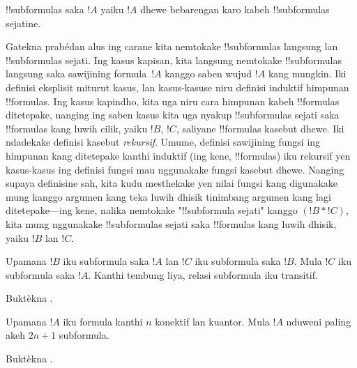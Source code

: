 \documentclass[../../../include/open-logic-section]{subfiles}
\begin{document}
\begin{defn}[!!^{subformula}]
!!{subformula}s saka $!A$ yaiku $!A$ dhewe bebarengan karo kabeh
!!{subformula}s sejatine.
\end{defn}

\begin{explain}
Gatekna prabédan alus ing carane kita nemtokake !!{subformula}s
langsung lan !!{subformula}s sejati. Ing kasus kapisan, kita
langsung nemtokake !!{subformula}s langsung saka sawijining
formula~$!A$ kanggo saben wujud $!A$ kang mungkin. Iki definisi
eksplisit miturut kasus, lan kasus-kasuse niru definisi induktif
himpunan !!{formula}s. Ing kasus kapindho, kita uga niru cara
himpunan kabeh !!{formula}s ditetepake, nanging ing saben kasus kita
uga nyakup !!{subformula}s sejati saka !!{formula}s kang luwih cilik,
yaiku $!B$, $!C$, saliyane !!{formula}s kasebut dhewe. Iki ndadekake
definisi kasebut \emph{rekursif}. Umume, definisi sawijining fungsi
ing himpunan kang ditetepake kanthi induktif (ing kene, !!{formula}s)
iku rekursif yen kasus-kasus ing definisi fungsi mau nggunakake
fungsi kasebut dhewe. Nanging supaya definisine sah, kita kudu
mesthekake yen nilai fungsi kang digunakake mung kanggo argumen
kang teka luwih dhisik tinimbang argumen kang lagi ditetepake---ing
kene, nalika nemtokake "!!{subformula} sejati" kanggo $(!B \ast !C)$,
kita mung nggunakake !!{subformula}s sejati saka !!{formula}s
kang luwih dhisik, yaiku $!B$ lan $!C$.
\end{explain}

\begin{prop}
Upamana $!B$ iku subformula saka $!A$ lan $!C$ iku subformula saka $!B$.
Mula $!C$ iku subformula saka $!A$. Kanthi tembung liya, relasi
subformula iku transitif.
\end{prop}

\begin{prob}
Buktèkna .
\end{prob}

\begin{prop}
Upamana $!A$ iku formula kanthi $n$ konektif lan kuantor.
Mula $!A$ nduweni paling akeh $2n+1$ subformula.
\end{prop}

\begin{prob}
Buktèkna .
\end{prob}
\end{document}
